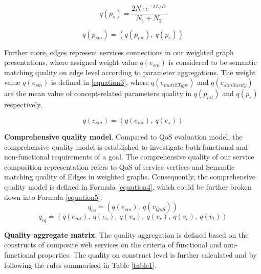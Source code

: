 \documentclass{llncs}
\begin{document}
\begin{equation}
q(p_ {s}){=} \frac{2N \cdot e^{-\lambda L/D} }{N_{1}+N_{2}}
\label{equation1}
\end{equation}

\begin{equation}
\label{equation2}
q(p_{sm}) \stackrel{.}{=} (q(p_ {mt}), \  q(p_ {s}))
\end{equation}

Further more, edges represent services connections in our weighted graph presentations, where assigned weight value $q(e_{sm})$ is considered to be semantic matching quality on edge level according to parameter aggregations. The weight value $q(e_{sm})$ is defined in \ref{equation3}, where $q(e_ {matchType})$ and $q(e_ {similarity})$ are the mean value of concept-related parameters quality in $q(p_{mt})$ and $q(p_{s})$ respectively. 

\begin{equation}
\label{equation3}
q(e_{sm}) \stackrel{.}{=} (q(e_ {mt}), \  q(e_ {s}))
\end{equation}

\textbf{Comprehensive quality model}. Compared to QoS evaluation model, the comprehensive quality model is established to investigate both functional and non-functional requirements of a goal. The comprehensive quality of our service composition representation refers to QoS of service vertices and Semantic matching quality of Edges in weighted graphs. Consequently, the comprehensive quality model is defined in Formula \ref{equation4}, which could be further broken down into Formula \ref{equation5}. 
\begin{equation}
\label{equation4}
q_{cq} \stackrel{.}{=} (q(e_ {sm}), \  q(v_ {QoS}))
\end{equation}
\begin{equation}
\label{equation5}
q_{cq} \stackrel{.}{=} (q(e_ {mt}), \  q(e_ {s}), \  q(v_{a}),\  q(v_{r}),\  q(v_{c}),\  q(v_{t}))
\end{equation}

\textbf{Quality aggregate matrix}. The quality aggregation is defined based on the constructs of composite web services on the criteria of functional and non-functional properties. The quality on construct level is further calculated and by following the rules summarised in Table \ref{table1}. 
\end{document}
